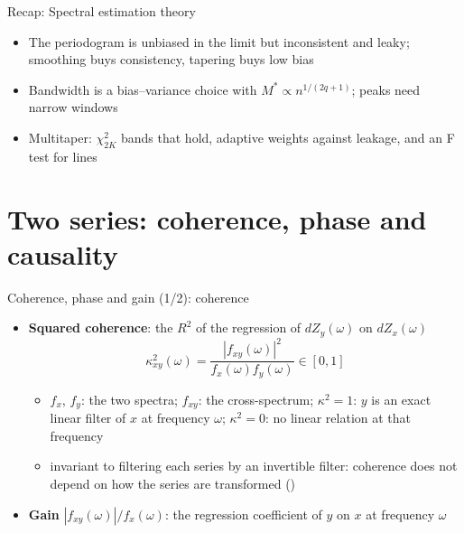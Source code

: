 \begin{frame}{Recap: Spectral estimation theory}
\itemsize{\small}
\begin{itemize}
    \item The periodogram is unbiased in the limit but inconsistent and leaky; smoothing buys consistency, tapering buys low bias
    \item Bandwidth is a bias--variance choice with $M^* \propto n^{1/(2q+1)}$; peaks need narrow windows
    \item Multitaper: $\chi^2_{2K}$ bands that hold, adaptive weights against leakage, and an F test for lines
\end{itemize}
\end{frame}


\section{Two series: coherence, phase and causality}

\begin{frame}{Coherence, phase and gain (1/2): coherence}
\itemsize{\small}
\begin{itemize}
    \item \textbf{Squared coherence}: the $R^2$ of the regression of $dZ_y(\omega)$ on $dZ_x(\omega)$
    \[ \kappa^2_{xy}(\omega) = \frac{|f_{xy}(\omega)|^2}{f_x(\omega)f_y(\omega)} \in [0, 1] \]
    \begin{itemize}
        \item $f_x$, $f_y$: the two spectra; $f_{xy}$: the cross-spectrum; $\kappa^2 = 1$: $y$ is an exact linear filter of $x$ at frequency $\omega$; $\kappa^2 = 0$: no linear relation at that frequency
        \item invariant to filtering each series by an invertible filter: coherence does not depend on how the series are transformed ()  %
    \end{itemize}
    \item \textbf{Gain} $|f_{xy}(\omega)|/f_x(\omega)$: the regression coefficient of $y$ on $x$ at frequency $\omega$
\end{itemize}
\end{frame}

